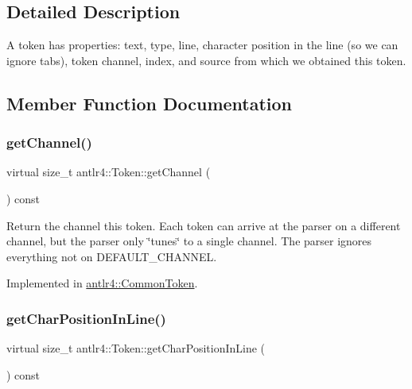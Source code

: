 \subsection{Detailed Description}
A token has properties\+: text, type, line, character position in the line (so we can ignore tabs), token channel, index, and source from which we obtained this token. 

\subsection{Member Function Documentation}
\mbox{\label{classantlr4_1_1Token_a92991c0566e4cb00ae2c5f9e7d8fe6b4}} 
\subsubsection{\texorpdfstring{get\+Channel()}{getChannel()}}
{\footnotesize\ttfamily virtual size\+\_\+t antlr4\+::\+Token\+::get\+Channel (\begin{DoxyParamCaption}{ }\end{DoxyParamCaption}) const\hspace{0.3cm}{\ttfamily [pure virtual]}}

Return the channel this token. Each token can arrive at the parser on a different channel, but the parser only \char`\"{}tunes\char`\"{} to a single channel. The parser ignores everything not on D\+E\+F\+A\+U\+L\+T\+\_\+\+C\+H\+A\+N\+N\+EL. 

Implemented in \hyperlink{classantlr4_1_1CommonToken_a30b47e4ec7c1b02bde9b38530d8fe358}{antlr4\+::\+Common\+Token}.

\mbox{\label{classantlr4_1_1Token_af4e82682816ba4166068e5b525dee31d}} 
\subsubsection{\texorpdfstring{get\+Char\+Position\+In\+Line()}{getCharPositionInLine()}}
{\footnotesize\ttfamily virtual size\+\_\+t antlr4\+::\+Token\+::get\+Char\+Position\+In\+Line (\begin{DoxyParamCaption}{ }\end{DoxyParamCaption}) const\hspace{0.3cm}{\ttfamily [pure virtual]}}

